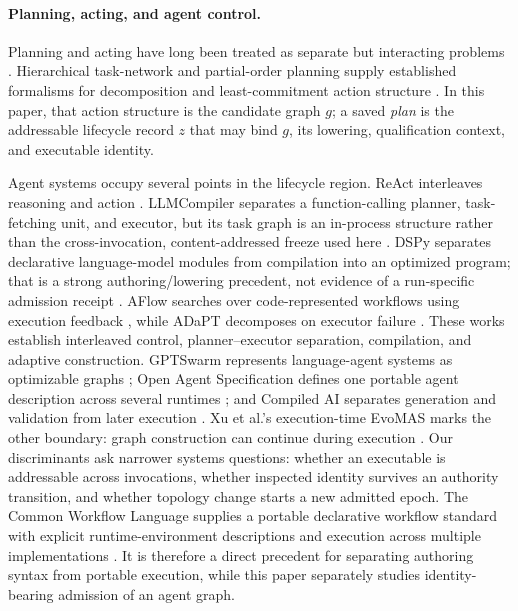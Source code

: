 \documentclass[11pt]{article}
\begin{document}
\paragraph{Planning, acting, and agent control.}
Planning and acting have long been treated as separate but interacting
problems \cite{Ghallab2016PlanningActing}.  Hierarchical task-network and
partial-order planning supply established formalisms for decomposition and
least-commitment action structure \cite{Georgievski2015HTNOverview,Younes2003VHPOP}.
In this paper, that action structure is the candidate graph \(g\); a saved
\emph{plan} is the addressable lifecycle record \(z\) that may bind \(g\), its
lowering, qualification context, and executable identity.

Agent systems occupy several points in the lifecycle region.  ReAct
interleaves reasoning and action \cite{Yao2023ReAct}.  LLMCompiler separates a
function-calling planner, task-fetching unit, and executor, but its task graph
is an in-process structure rather than the cross-invocation, content-addressed
freeze used here \cite{Kim2024LLMCompiler}.  DSPy separates declarative
language-model modules from compilation into an optimized program; that is a
strong authoring/lowering precedent, not evidence of a run-specific admission
receipt \cite{Khattab2024DSPy}.  AFlow searches over code-represented workflows
using execution feedback \cite{Zhang2025AFlow}, while ADaPT decomposes on
executor failure \cite{Prasad2024ADaPT}.  These works establish interleaved
control, planner--executor separation, compilation, and adaptive construction.
GPTSwarm represents language-agent systems as optimizable graphs
\cite{Zhuge2024GPTSwarm}; Open Agent Specification defines one portable agent
description across several runtimes \cite{Amini2025OpenAgentSpec}; and Compiled
AI separates generation and validation from later execution
\cite{Trooskens2026CompiledAI}. Xu et al.'s execution-time EvoMAS marks the
other boundary: graph construction can continue during execution
\cite{Xu2026EvoMAS}.
Our discriminants ask narrower systems questions: whether an executable is
addressable across invocations, whether inspected identity survives an
authority transition, and whether topology change starts a new admitted epoch.
The Common Workflow Language supplies a portable declarative workflow
standard with explicit runtime-environment descriptions and execution across
multiple implementations \cite{Crusoe2022CWL}. It is therefore a direct
precedent for separating authoring syntax from portable execution, while this
paper separately studies identity-bearing admission of an agent graph.
\end{document}
